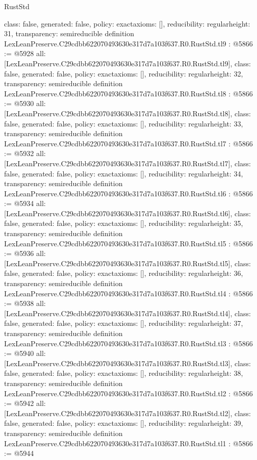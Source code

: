 \begin{lexlean}{RustStd}
\begin{coremodule}
{  class: false,
  generated: false,
  policy: exact{axioms: []},
  reducibility: regular{height: 31},
  transparency: semireducible
}
definition LexLeanPreserve.C29cdbb622070493630e317d7a103f637.R0.RustStd.tl9 : @5866 := @5928 {
  all: [LexLeanPreserve.C29cdbb622070493630e317d7a103f637.R0.RustStd.tl9],
  class: false,
  generated: false,
  policy: exact{axioms: []},
  reducibility: regular{height: 32},
  transparency: semireducible
}
definition LexLeanPreserve.C29cdbb622070493630e317d7a103f637.R0.RustStd.tl8 : @5866 := @5930 {
  all: [LexLeanPreserve.C29cdbb622070493630e317d7a103f637.R0.RustStd.tl8],
  class: false,
  generated: false,
  policy: exact{axioms: []},
  reducibility: regular{height: 33},
  transparency: semireducible
}
definition LexLeanPreserve.C29cdbb622070493630e317d7a103f637.R0.RustStd.tl7 : @5866 := @5932 {
  all: [LexLeanPreserve.C29cdbb622070493630e317d7a103f637.R0.RustStd.tl7],
  class: false,
  generated: false,
  policy: exact{axioms: []},
  reducibility: regular{height: 34},
  transparency: semireducible
}
definition LexLeanPreserve.C29cdbb622070493630e317d7a103f637.R0.RustStd.tl6 : @5866 := @5934 {
  all: [LexLeanPreserve.C29cdbb622070493630e317d7a103f637.R0.RustStd.tl6],
  class: false,
  generated: false,
  policy: exact{axioms: []},
  reducibility: regular{height: 35},
  transparency: semireducible
}
definition LexLeanPreserve.C29cdbb622070493630e317d7a103f637.R0.RustStd.tl5 : @5866 := @5936 {
  all: [LexLeanPreserve.C29cdbb622070493630e317d7a103f637.R0.RustStd.tl5],
  class: false,
  generated: false,
  policy: exact{axioms: []},
  reducibility: regular{height: 36},
  transparency: semireducible
}
definition LexLeanPreserve.C29cdbb622070493630e317d7a103f637.R0.RustStd.tl4 : @5866 := @5938 {
  all: [LexLeanPreserve.C29cdbb622070493630e317d7a103f637.R0.RustStd.tl4],
  class: false,
  generated: false,
  policy: exact{axioms: []},
  reducibility: regular{height: 37},
  transparency: semireducible
}
definition LexLeanPreserve.C29cdbb622070493630e317d7a103f637.R0.RustStd.tl3 : @5866 := @5940 {
  all: [LexLeanPreserve.C29cdbb622070493630e317d7a103f637.R0.RustStd.tl3],
  class: false,
  generated: false,
  policy: exact{axioms: []},
  reducibility: regular{height: 38},
  transparency: semireducible
}
definition LexLeanPreserve.C29cdbb622070493630e317d7a103f637.R0.RustStd.tl2 : @5866 := @5942 {
  all: [LexLeanPreserve.C29cdbb622070493630e317d7a103f637.R0.RustStd.tl2],
  class: false,
  generated: false,
  policy: exact{axioms: []},
  reducibility: regular{height: 39},
  transparency: semireducible
}
definition LexLeanPreserve.C29cdbb622070493630e317d7a103f637.R0.RustStd.tl1 : @5866 := @5944 {
}
\end{coremodule}
\end{lexlean}
